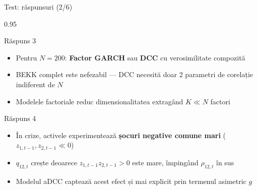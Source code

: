 \documentclass[9pt, aspectratio=169, t]{beamer}
\begin{document}
\begin{frame}{Test: răspunsuri (2/6)}
    \begin{cminipage}{0.95\textwidth}
    {\scriptsize
    \begin{exampleblock}{Răspuns 3}
        \begin{itemize}\setlength{\itemsep}{0pt}
            \item Pentru $N = 200$: \textbf{Factor GARCH} sau \textbf{DCC} cu verosimilitate compozită
            \item BEKK complet este nefezabil --- DCC necesită doar 2 parametri de corelație indiferent de $N$
            \item Modelele factoriale reduc dimensionalitatea extragând $K \ll N$ factori
        \end{itemize}
    \end{exampleblock}
    \begin{exampleblock}{Răspuns 4}
        \begin{itemize}\setlength{\itemsep}{0pt}
            \item În crize, activele experimentează \textbf{șocuri negative comune mari} ($z_{1,t-1}, z_{2,t-1} \ll 0$)
            \item $q_{12,t}$ crește deoarece $z_{1,t-1}z_{2,t-1} > 0$ este mare, împingând $\rho_{12,t}$ în sus
            \item Modelul aDCC captează acest efect și mai explicit prin termenul asimetric $g$
        \end{itemize}
    \end{exampleblock}
    }
    \end{cminipage}
\end{frame}
\end{document}
